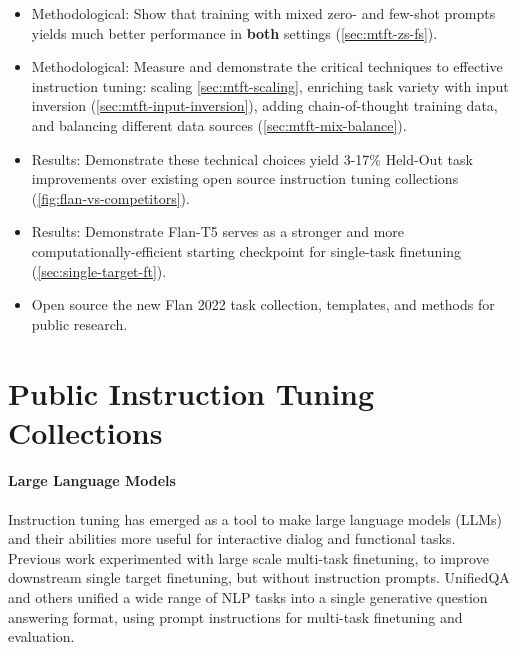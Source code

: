 \begin{itemize}\itemsep0em

    \item Methodological: Show that training with mixed zero- and few-shot prompts yields much better performance in \textbf{both} settings (\ref{sec:mtft-zs-fs}).
    \item Methodological: Measure and demonstrate the critical techniques to effective instruction tuning: scaling \ref{sec:mtft-scaling}, enriching task variety with input inversion (\ref{sec:mtft-input-inversion}), adding chain-of-thought training data, and balancing different data sources (\ref{sec:mtft-mix-balance}).
    \item Results: Demonstrate these technical choices yield 3-17\% Held-Out task improvements over existing open source instruction tuning collections (\ref{fig:flan-vs-competitors}).
    \item Results: Demonstrate Flan-T5 serves as a stronger and more computationally-efficient starting checkpoint for single-task finetuning (\ref{sec:single-target-ft}).
    \item Open source the new Flan 2022 task collection, templates, and methods for public research.
\end{itemize}

\section{Public Instruction Tuning Collections}
\label{sec:public-collections}

\paragraph{Large Language Models} Instruction tuning has emerged as a tool to make large language models (LLMs) and their abilities more useful for interactive dialog and functional tasks. Previous work \citep{raffel2020exploring, liu2019multi,aghajanyan-etal-2021-muppet, aribandi2021ext5} experimented with large scale multi-task finetuning, to improve downstream single target finetuning, but without instruction prompts. UnifiedQA and others \citep{khashabi-etal-2020-unifiedqa, mccann2018natural, keskar2019unifying} unified a wide range of NLP tasks into a single generative question answering format, using prompt instructions for multi-task finetuning and evaluation.

